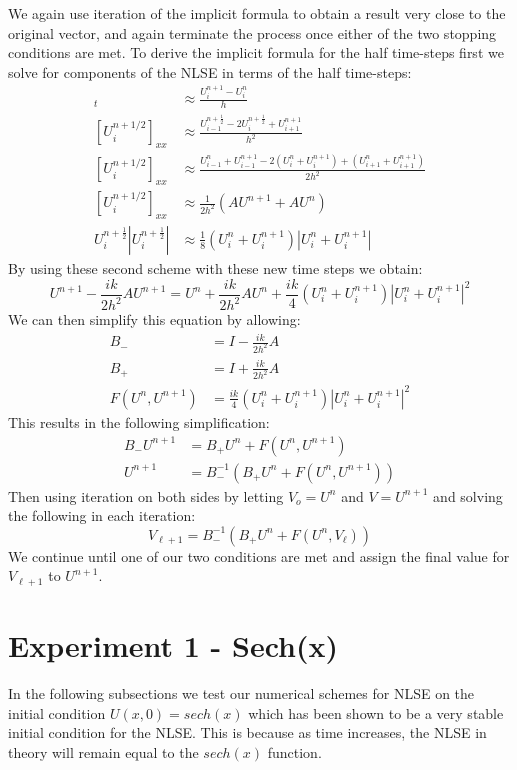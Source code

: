 \documentclass[11pt, oneside]{article}   	%
\begin{document}
We again use iteration of the implicit formula to obtain a result very close to the original vector, and again terminate the process once either of the two stopping conditions are met.
\newline
To derive the implicit formula for the half time-steps first we solve for components of the NLSE in terms of the half time-steps:
\begin{align*}
    [U_i^{n+1/2}]_t &\approx\frac{U_i^{n+1} - U_i^n}{h}\\
    [U_i^{n+1/2}]_{xx} &\approx \frac{U_{i-1}^{n+\frac{1}{2}} - 2 U_i^{n+\frac{1}{2}} +U_{i+1}^{n+1}}{h^2}\\
    [U_i^{n+1/2}]_{xx} &\approx \frac{U_{i-1}^{n} + U_{i-1}^{n+1} - 2(U_i^n + U_i^{n+1}) + (U_{i+1}^n + U_{i+1}^{n+1})}{2h^2}\\
    [U_i^{n+1/2}]_{xx} &\approx \frac{1}{2h^2}(A U^{n+1} + A U^n)\\
    U_i^{n+\frac{1}{2}}|U_i^{n+\frac{1}{2}}| &\approx \frac{1}{8}(U_i^n+U_i^{n+1})|U_i^n+U_i^{n+1}|
\end{align*}
By using these second scheme with these new time steps we obtain:
\[
    U^{n+1} - \frac{ik}{2h^2}AU^{n+1} = U^n + \frac{ik}{2h^2}AU^{n} +  \frac{ik}{4}(U_i^n+U_i^{n+1})|U_i^n+U_i^{n+1}|^2
\]
We can then simplify this equation by allowing:
\begin{align*}
    B_- &= I - \frac{ik}{2h^2}A\\
    B_+ &= I + \frac{ik}{2h^2}A\\
    F(U^n,U^{n+1}) &= \frac{ik}{4}(U_i^n+U_i^{n+1})|U_i^n+U_i^{n+1}|^2
\end{align*}
This results in the following simplification:
\begin{align*}
    B_- U^{n+1} &= B_+ U^n + F(U^n,U^{n+1})\\
    U^{n+1} &= B_-^{-1}(B_+ U^n + F(U^n,U^{n+1}))
\end{align*}
Then using iteration on both sides by letting $V_o = U^n$ and $V = U^{n+1}$ and solving the following in each iteration:
\[ V_{\ell+1} = B_-^{-1}(B_+ U^n + F(U^n,V_{\ell}))\]
We continue until one of our two conditions are met and assign the final value for $V_{\ell +1}$ to $U^{n+1}$.


\section{Experiment 1 - Sech(x)}
In the following subsections we test our numerical schemes for NLSE on the initial condition $U(x,0) = sech(x)$ which has been shown to be a very stable initial condition for the NLSE. This is because as time increases, the NLSE in theory will remain equal to the $sech(x)$ function.
\end{document}
